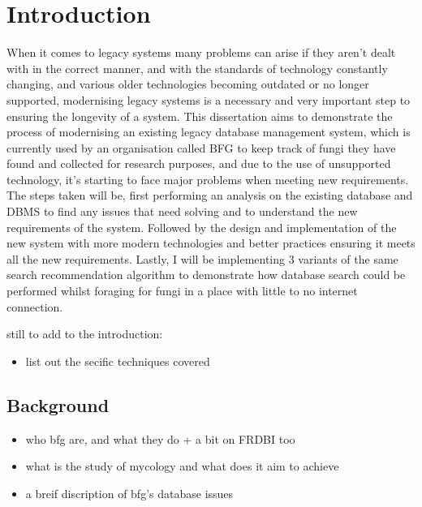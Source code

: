 
\chapter{Introduction}
When it comes to legacy systems many problems can arise if they aren't dealt with in the correct manner,
and with the standards of technology constantly changing, and various older technologies becoming outdated or no longer supported,
modernising legacy systems is a necessary and very important step to ensuring the longevity of a system.
This dissertation aims to demonstrate the process of modernising an existing legacy database management system,
which is currently used by an organisation called BFG to keep track of fungi they have found and collected for research purposes,
and due to the use of unsupported technology, it's starting to face major problems when meeting new requirements.
The steps taken will be, first performing an analysis on the existing database and DBMS
to find any issues that need solving and to understand the new requirements of the system.
Followed by the design and implementation of the new system with more modern technologies and better practices
ensuring it meets all the new requirements.
Lastly, I will be implementing 3 variants of the same search recommendation algorithm
to demonstrate how database search could be performed whilst foraging for fungi in a place with little to no internet connection.

still to add to the introduction:
\begin{itemize}
\item list out the secific techniques covered
\end{itemize}

\section{Background}
\begin{itemize}
\item who bfg are, and what they do + a bit on FRDBI too
\item what is the study of mycology and what does it aim to achieve
\item a breif discription of bfg's database issues
\end{itemize}